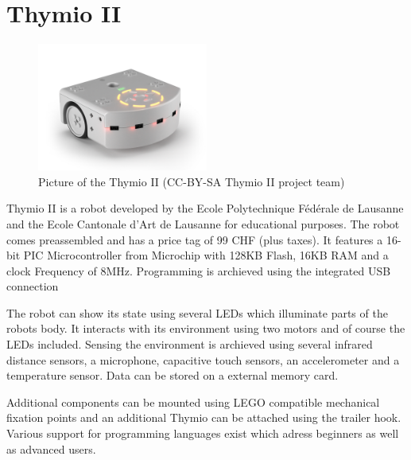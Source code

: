 \section{Thymio II}
\begin{figure}[H]
  \centering
  \includegraphics[width=0.5\textwidth]{images/thymioii.jpg}
  \caption{Picture of the Thymio II (CC-BY-SA Thymio II project team)}
\end{figure}

Thymio II is a robot developed by the Ecole Polytechnique Fédérale de Lausanne and the Ecole Cantonale d'Art de Lausanne for educational purposes. The robot comes preassembled and has a price tag of 99 CHF (plus taxes). It features a 16-bit PIC Microcontroller from Microchip with 128KB Flash, 16KB RAM and a clock Frequency of 8MHz. Programming is archieved using the integrated USB connection

The robot can show its state using several LEDs which illuminate parts of the robots body. It interacts with its environment using two motors and of course the LEDs included. Sensing the environment is archieved using several infrared distance sensors, a microphone, capacitive touch sensors, an accelerometer and a temperature sensor. Data can be stored on a external memory card.

Additional components can be mounted using LEGO compatible mechanical fixation points and an additional Thymio can be attached using the trailer hook. Various support for programming languages exist which adress beginners as well as advanced users.


